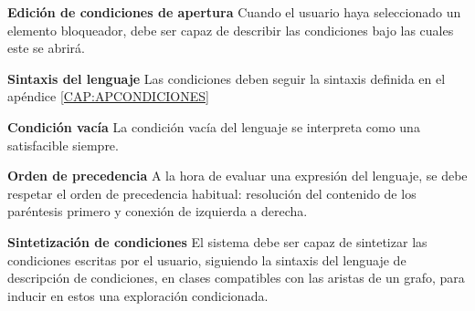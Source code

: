 \item \textbf{Edición de condiciones de apertura}\newline
	Cuando el usuario haya seleccionado un elemento bloqueador, debe ser capaz de describir las condiciones bajo las cuales este se abrirá.
	\begin{functional}
		\item \textbf{Sintaxis del lenguaje}\newline
			Las condiciones deben seguir la sintaxis definida en el apéndice \ref{CAP:APCONDICIONES}
		\item \textbf{Condición vacía}\newline
			La condición vacía del lenguaje se interpreta como una satisfacible siempre.
		\item \textbf{Orden de precedencia}\newline
			A la hora de evaluar una expresión del lenguaje, se debe respetar el orden de precedencia habitual: resolución del contenido de los paréntesis primero y conexión de izquierda a derecha.
	\end{functional}
\item \textbf{Sintetización de condiciones}\newline
	El sistema debe ser capaz de sintetizar las condiciones escritas por el usuario, siguiendo la sintaxis del lenguaje de descripción de condiciones, en clases compatibles con las aristas de un grafo, para inducir en estos una exploración condicionada.